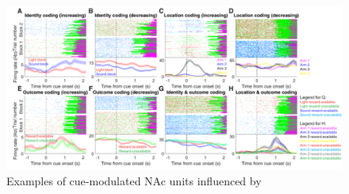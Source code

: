 \documentclass[11pt]{article}
\providecommand{\DIFdel}[1]{} %
\providecommand{\DIFdelFL}[1]{\DIFdel{#1}} %
\providecommand{\DIFaddbeginFL}{} %
\providecommand{\DIFaddendFL}{} %
\providecommand{\DIFdelbeginFL}{} %
\providecommand{\DIFdelendFL}{} %
\newcommand{\DIFscaledelfig}{0.5}
\newlength{\DIFdelgraphicswidth} %
\newlength{\DIFdelgraphicsheight} %
\newcommand{\DIFaddincludegraphics}[2][]{{\color{red}\fbox{\DIFOincludegraphics[#1]{#2}}}} %
\newcommand{\DIFdelincludegraphics}[2][]{%
\sbox{\DIFdelgraphicsbox}{\DIFOincludegraphics[#1]{#2}}%
\settoboxwidth{\DIFdelgraphicswidth}{\DIFdelgraphicsbox} %
\settoboxtotalheight{\DIFdelgraphicsheight}{\DIFdelgraphicsbox} %
\scalebox{\DIFscaledelfig}{%
\parbox[b]{\DIFdelgraphicswidth}{\usebox{\DIFdelgraphicsbox}\\[-\baselineskip] \rule{\DIFdelgraphicswidth}{0em}}\llap{\resizebox{\DIFdelgraphicswidth}{\DIFdelgraphicsheight}{%
\setlength{\unitlength}{\DIFdelgraphicswidth}%
\begin{picture}(1,1)%
\thicklines\linethickness{2pt} %
{\color[rgb]{1,0,0}\put(0,0){\framebox(1,1){}}}%
{\color[rgb]{1,0,0}\put(0,0){\line( 1,1){1}}}%
{\color[rgb]{1,0,0}\put(0,1){\line(1,-1){1}}}%
\end{picture}%
}\hspace*{3pt}}} %
} %
\DeclareRobustCommand{\DIFaddbeginFL}{\DIFOaddbeginFL \let\includegraphics\DIFaddincludegraphics} %
\DeclareRobustCommand{\DIFaddendFL}{\DIFOaddendFL \let\includegraphics\DIFOincludegraphics} %
\DeclareRobustCommand{\DIFdelbeginFL}{\DIFOdelbeginFL \let\includegraphics\DIFdelincludegraphics} %
\DeclareRobustCommand{\DIFdelendFL}{\DIFOaddendFL \let\includegraphics\DIFOincludegraphics} %
\begin{document}
 \begin{figure}[ht!]
\centering
\DIFdelbeginFL %
\DIFdelendFL \DIFaddbeginFL \includegraphics[width=\textwidth]{Fig 3 - Neural examples.pdf}
\DIFaddendFL \caption{Examples of \DIFdelbeginFL \DIFdelFL{different }\DIFdelendFL cue-modulated NAc units influenced by \DIFdelbeginFL \DIFdelFL{various
}}
\end{figure}
\end{document}

